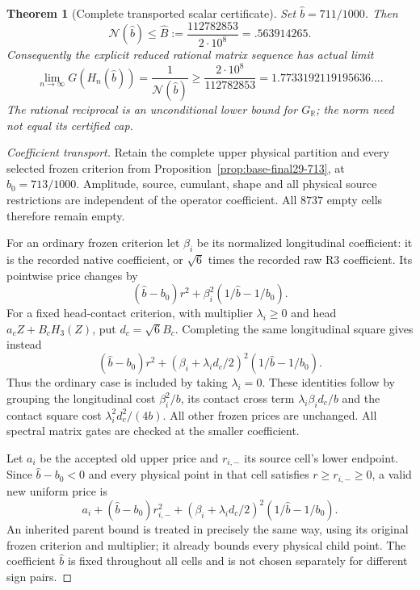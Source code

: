 \documentclass[11pt]{article}
\newcommand{\N}{\mathcal N}
\newtheorem{theorem}{Theorem}
\begin{document}
\begin{theorem}[Complete transported scalar certificate]
\label{thm:final-preferred-polygon}
Set $\widehat b=711/1000$. Then
\[
 \N(\widehat b)\le\widehat B:=\frac{112782853}{2\cdot10^8}
 =.563914265.
\]
Consequently the explicit reduced rational matrix sequence has actual limit
\[
 \lim_{n\to\infty}G(H_n(\widehat b))
 =\frac1{\N(\widehat b)}
 \ge\frac{2\cdot10^8}{112782853}
 =1.7733192119195636\ldots .
\]
The rational reciprocal is an unconditional lower bound for
$G_{\mathbb R}$; the norm need not equal its certified cap.
\end{theorem}
\begin{proof}[Coefficient transport]
Retain the complete upper physical partition and every selected frozen
criterion from Proposition~\ref{prop:base-final29-713}, at
$b_0=713/1000$. Amplitude, source, cumulant, shape and all physical
source restrictions are independent of the operator coefficient.
All $8737$ empty cells therefore remain empty.

For an ordinary frozen criterion let $\beta_i$ be its normalized
longitudinal coefficient: it is the recorded native coefficient, or
$\sqrt6$ times the recorded raw R3 coefficient. Its pointwise price
changes by
\[
 (\widehat b-b_0)r^2+
 \beta_i^2(1/\widehat b-1/b_0).
\]
For a fixed head-contact criterion, with multiplier $\lambda_i\ge0$
and head $a_cZ+B_cH_3(Z)$, put $d_c=\sqrt6B_c$. Completing the same
longitudinal square gives instead
\[
 (\widehat b-b_0)r^2+
 (\beta_i+\lambda_i d_c/2)^2
       (1/\widehat b-1/b_0).
\]
Thus the ordinary case is included by taking $\lambda_i=0$.
These identities follow by grouping the longitudinal cost
$\beta_i^2/b$, its contact cross term
$\lambda_i\beta_i d_c/b$ and the contact square cost
$\lambda_i^2d_c^2/(4b)$. All other frozen prices are unchanged.
All spectral matrix gates are checked at the smaller coefficient.

Let $a_i$ be the accepted old upper price and $r_{i,-}$ its source
cell's lower endpoint. Since $\widehat b-b_0<0$ and every physical
point in that cell satisfies $r\ge r_{i,-}\ge0$, a valid new uniform
price is
\[
 a_i+(\widehat b-b_0)r_{i,-}^2+
 (\beta_i+\lambda_i d_c/2)^2(1/\widehat b-1/b_0).
\]
An inherited parent bound is treated in precisely the same way, using
its original frozen criterion and multiplier; it already bounds every
physical child point. The coefficient $\widehat b$ is fixed throughout
all cells and is not chosen separately for different sign pairs.


\end{proof}
\end{document}
